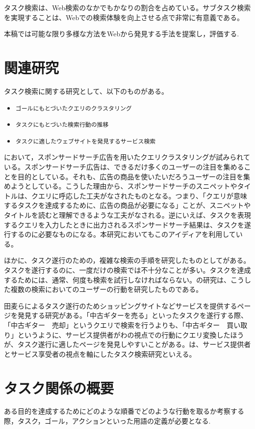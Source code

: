 \documentclass[submit,techreq]{ipsj}
\def\|{\verb|}
\begin{document}
タスク検索は、Web検索のなかでもかなりの割合を占めている。サブタスク検索を実現することは、Webでの検索体験を向上させる点で非常に有意義である。

本稿では可能な限り多様な方法をWebから発見する手法を提案し，評価する.


%2
\section{関連研究}

タスク検索に関する研究として、以下のものがある。

\begin{itemize}
\item \|ゴールにもとづいたクエリのクラスタリング|
\item \|タスクにもとづいた検索行動の推移|
\item \|タスクに適したウェブサイトを発見するサービス検索|
\end{itemize}

\cite{yamatake}において，スポンサードサーチ広告を用いたクエリクラスタリングが試みられている。スポンサードサーチ広告は、できるだけ多くのユーザーの注目を集めることを目的としている。それも、広告の商品を使いたいだろうユーザーの注目を集めようとしている。こうした理由から、スポンサードサーチのスニペットやタイトルは、クエリに呼応した工夫がなされたものとなる。つまり、「クエリが意味するタスクを達成するために、広告の商品が必要になる」ことが、スニペットやタイトルを読むと理解できるような工夫がなされる。逆にいえば、タスクを表現するクエリを入力したときに出力されるスポンサードサーチ結果は、タスクを遂行するのに必要なものになる。本研究においてもこのアイディアを利用している。

ほかに、タスク遂行のための，複雑な検索の手順を研究したものとして\cite{hassan}がある。タスクを遂行するのに、一度だけの検索では不十分なことが多い。タスクを達成するためには、通常、何度も検索を試行しなければならない。\cite{hassan}の研究は、こうした複数の検索においてのユーザーの行動を研究したものである。


田麦らによるタスク遂行のためショッピングサイトなどサービスを提供するページを発見する研究\cite{tamugi}がある。「中古ギターを売る」といったタスクを遂行する際、「中古ギター　売却」というクエリで検索を行うよりも、「中古ギター　買い取り」というように、サービス提供者がわの視点での行動にクエリ変換したほうが、タスク遂行に適したページを発見しやすいことがある。\cite{tamugi}は、サービス提供者とサービス享受者の視点を軸にしたタスク検索研究といえる。


\section{タスク関係の概要}
ある目的を達成するためにどのような順番でどのような行動を取るか考察する際，タスク，ゴール，アクションといった用語の定義が必要となる.
\end{document}
